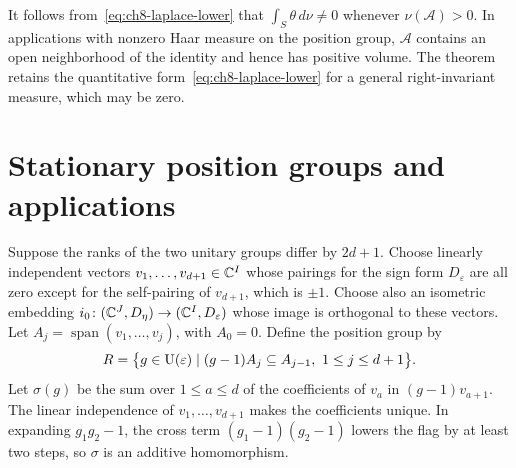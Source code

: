 \begin{remark}
It follows from~\eqref{eq:ch8-laplace-lower} that $\int_S\theta\,d\nu\ne0$ whenever $\nu(\mathcal A)>0$. In applications with nonzero Haar measure on the position group, $\mathcal A$ contains an open neighborhood of the identity and hence has positive volume. The theorem retains the quantitative form~\eqref{eq:ch8-laplace-lower} for a general right-invariant measure, which may be zero.
\end{remark}

\section{Stationary position groups and applications}
\label{sec:ch8-stationary-position}

Suppose the ranks of the two unitary groups differ by $2d+1$. Choose linearly independent vectors $v_1,\ldots,v_{d+1}\in\mathbb{C}^I$ whose pairings for the sign form $D_\varepsilon$ are all zero except for the self-pairing of $v_{d+1}$, which is $\pm1$. Choose also an isometric embedding $i_0\colon(\mathbb{C}^J,D_\eta)\to(\mathbb{C}^I,D_\varepsilon)$ whose image is orthogonal to these vectors. Let $A_j=\operatorname{span}(v_1,\ldots,v_j)$, with $A_0=0$. Define the position group by
\[
 R=\bigl\{g\in \operatorname{U}(\varepsilon)\mid (g-1)A_j\subseteq A_{j-1},\
                   1\le j\le d+1\bigr\}.
\]
Let $\sigma(g)$ be the sum over $1\le a\le d$ of the coefficients of $v_a$ in $(g-1)v_{a+1}$. The linear independence of $v_1,\ldots,v_{d+1}$ makes the coefficients unique. In expanding $g_1g_2-1$, the cross term $(g_1-1)(g_2-1)$ lowers the flag by at least two steps, so $\sigma$ is an additive homomorphism.

